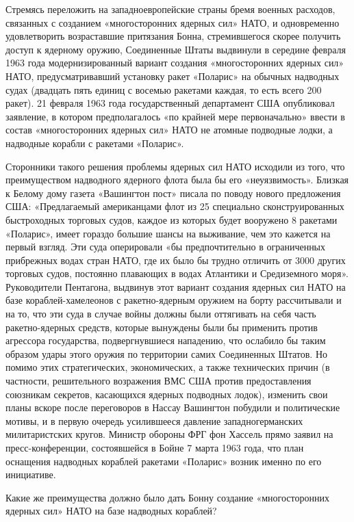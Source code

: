 \documentclass[12pt, a4paper, openany]{book}
\begin{document}
Стремясь переложить на западноевропейские страны бремя военных расходов, связанных с созданием «многосторонних ядерных сил» НАТО, и одновременно удовлетворить возраставшие притязания Бонна, стремившегося скорее получить доступ к ядерному оружию, Соединенные Штаты выдвинули в середине февраля 1963 года модернизированный вариант создания «многосторонних ядерных сил» НАТО, предусматривавший установку ракет «Поларис» на обычных надводных судах (двадцать пять единиц с восемью ракетами каждая, то есть всего 200 ракет). 21 февраля 1963 года государственный департамент США опубликовал заявление, в котором предполагалось «по крайней мере первоначально» ввести в состав «многосторонних ядерных сил» НАТО не атомные подводные лодки, а надводные корабли с ракетами «Поларис».

Сторонники такого решения проблемы ядерных сил НАТО исходили из того, что преимуществом надводного ядерного флота была бы его «неуязвимость». Близкая к Белому дому газета «Вашингтон пост» писала по поводу нового предложения США: «Предлагаемый американцами флот из 25 специально сконструированных быстроходных торговых судов, каждое из которых будет вооружено 8 ракетами «Поларис», имеет гораздо большие шансы на выживание, чем это кажется на первый взгляд. Эти суда оперировали «бы предпочтительно в ограниченных прибрежных водах стран НАТО, где их было бы трудно отличить от 3000 других торговых судов, постоянно плавающих в водах Атлантики и Средиземного моря». Руководители Пентагона, выдвинув этот вариант создания ядерных сил НАТО на базе кораблей-хамелеонов с ракетно-ядерным оружием на борту рассчитывали и на то, что эти суда в случае войны должны были оттягивать на себя часть ракетно-ядерных средств, которые вынуждены были бы применить против агрессора государства, подвергнувшиеся нападению, что ослабило бы таким образом удары этого оружия по территории самих Соединенных Штатов. Но помимо этих стратегических, экономических, а также технических причин (в частности, решительного возражения ВМС США против предоставления союзникам секретов, касающихся ядерных подводных лодок), изменить свои планы вскоре после переговоров в Нассау Вашингтон побудили и политические мотивы, и в первую очередь усилившееся давление западногерманских милитаристских кругов. Министр обороны ФРГ фон Хассель прямо заявил на пресс-конференции, состоявшейся в Бойне 7 марта 1963 года, что план оснащения надводных кораблей ракетами «Поларис» возник именно по его инициативе.

Какие же преимущества должно было дать Бонну создание «многосторонних ядерных сил» НАТО на базе надводных кораблей?
\end{document}
